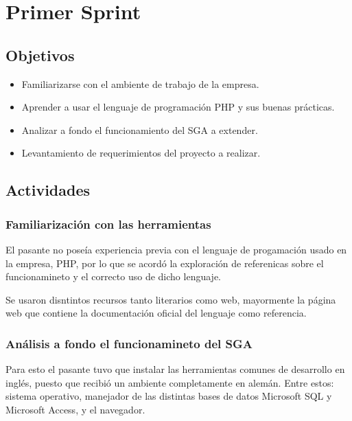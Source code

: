 \section{Primer Sprint} %
\label{sec:primer_sprint}

\subsection{Objetivos}

\begin{itemize}
	\item Familiarizarse con el ambiente de trabajo de la empresa.
	\item Aprender a usar el lenguaje de programación PHP y sus buenas prácticas.
	\item Analizar a fondo el funcionamiento del SGA a extender.
	\item Levantamiento de requerimientos del proyecto a realizar.
\end{itemize}

\subsection{Actividades} %
\label{sub:actividades}

\subsubsection{Familiarización con las herramientas}

El pasante no poseía experiencia previa con el lenguaje de progamación usado en la empresa, PHP, por lo que se acordó la exploración de referenicas sobre el funcionamineto y el correcto uso de dicho lenguaje.

Se usaron disntintos recursos tanto literarios como web, mayormente la página web que contiene la documentación oficial del lenguaje como referencia.

\subsubsection{Análisis a fondo el funcionamineto del SGA}

Para esto el pasante tuvo que instalar las herramientas comunes de desarrollo en inglés, puesto que recibió un ambiente completamente en alemán. Entre estos: sistema operativo, manejador de las distintas bases de datos Microsoft SQL y Microsoft Access, y el navegador.

